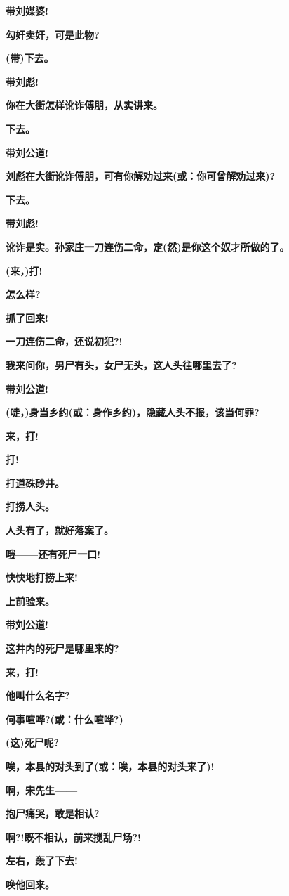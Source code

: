 \textbf{带刘媒婆!}

\textbf{勾奸卖奸，可是此物?}

\textbf{(带)下去。}

\textbf{带刘彪!}

\textbf{你在大街怎样讹诈傅朋，从实讲来。}

\textbf{下去。}

\textbf{带刘公道!}

\textbf{刘彪在大街讹诈傅朋，可有你解劝过来(或：你可曾解劝过来)?}

\textbf{下去。}

\textbf{带刘彪!}

\textbf{讹诈是实。孙家庄一刀连伤二命，定(然)是你这个奴才所做的了。}

\textbf{(来，)打!}

\textbf{怎么样?}

\textbf{抓了回来!}

\textbf{一刀连伤二命，还说初犯?!}

\textbf{我来问你，男尸有头，女尸无头，这人头往哪里去了?}

\textbf{带刘公道!}

\textbf{(唗，)身当乡约(或：身作乡约)，隐藏人头不报，该当何罪?}

\textbf{来，打!}

\textbf{打!}

\textbf{打道硃砂井。}

\textbf{打捞人头。}

\textbf{人头有了，就好落案了。}

\textbf{哦------还有死尸一口!}

\textbf{快快地打捞上来!}

\textbf{上前验来。}

\textbf{带刘公道!}

\textbf{这井内的死尸是哪里来的?}

\textbf{来，打!}

\textbf{他叫什么名字?}

\textbf{何事喧哗?(或：什么喧哗?)}

\textbf{(这)死尸呢?}

\textbf{唉，本县的对头到了(或：唉，本县的对头来了)!}

\textbf{啊，宋先生------}

\textbf{抱尸痛哭，敢是相认?}

\textbf{啊?!既不相认，前来搅乱尸场?!}

\textbf{左右，轰了下去!}

\textbf{唤他回来。}

